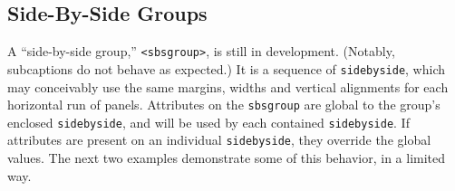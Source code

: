 \documentclass[10pt,]{article}
\theoremstyle{plain}
\theoremstyle{definition}
\theoremstyle{definition}
\theoremstyle{definition}
\theoremstyle{definition}
\theoremstyle{definition}
\theoremstyle{definition}
\numberwithin{equation}{section}
\begin{document}
\subsection[{Side-By-Side Groups}]{Side-By-Side Groups}\label{subsection-sbsgroup}
\hypertarget{p-719}{}%
A ``side-by-side group,'' \lstinline?<sbsgroup>?, is still in development.  (Notably, subcaptions do not behave as expected.)  It is a sequence of \lstinline?sidebyside?, which may conceivably use the same margins, widths and vertical alignments for each horizontal run of panels.  Attributes on the \lstinline?sbsgroup? are global to the group's enclosed \lstinline?sidebyside?, and will be used by each contained \lstinline?sidebyside?.  If attributes are present on an individual \lstinline?sidebyside?, they override the global values.  The next two examples demonstrate some of this behavior, in a limited way.%
\end{document}
